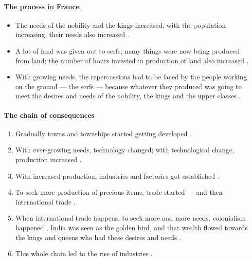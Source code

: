 \paragraph{The process in France}
\begin{itemize}
    \item The needs of the nobility and the kings increased; with the population increasing, their needs also increased .
    \item A lot of land was given out to serfs; many things were now being produced from land; the number of hours invested in production of land also increased .
    \item With growing needs, the repercussions had to be faced by the people working on the ground --- the serfs --- because whatever they produced was going to meet the desires and needs of the nobility, the kings and the upper classes .
\end{itemize}

\paragraph{The chain of consequences}
\begin{enumerate}
    \item Gradually towns and townships started getting developed .
    \item With ever-growing needs, technology changed; with technological change, production increased .
    \item With increased production, industries and factories got established .
    \item To seek more production of precious items, trade started --- and then international trade .
    \item When international trade happens, to seek more and more needs, colonialism happened . India was seen as the golden bird, and that wealth flowed towards the kings and queens who had these desires and needs .
    \item This whole chain led to the rise of industries .
\end{enumerate}

